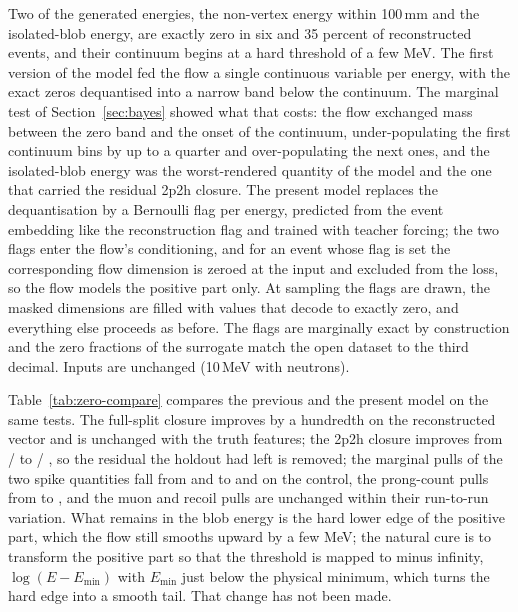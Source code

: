 \documentclass[11pt]{article}
\begin{document}
Two of the generated energies, the non-vertex energy within 100\,mm and the isolated-blob energy, are exactly
zero in six and 35 percent of reconstructed events, and their continuum begins at a hard threshold of a few MeV.
The first version of the model fed the flow a single continuous variable per energy, with the exact zeros
dequantised into a narrow band below the continuum. The marginal test of Section~\ref{sec:bayes} showed what that
costs: the flow exchanged mass between the zero band and the onset of the continuum, under-populating the first
continuum bins by up to a quarter and over-populating the next ones, and the isolated-blob energy was the
worst-rendered quantity of the model and the one that carried the residual 2p2h closure. The present model
replaces the dequantisation by a Bernoulli flag per energy, predicted from the event embedding like the
reconstruction flag and trained with teacher forcing; the two flags enter the flow's conditioning, and for an
event whose flag is set the corresponding flow dimension is zeroed at the input and excluded from the loss, so
the flow models the positive part only. At sampling the flags are drawn, the masked dimensions are filled with
values that decode to exactly zero, and everything else proceeds as before. The flags are marginally exact by
construction and the zero fractions of the surrogate match the open dataset to the third decimal. Inputs are
unchanged (10\,MeV with neutrons).

Table~\ref{tab:zero-compare} compares the previous and the present model on the same tests. The full-split
closure improves by a hundredth on the reconstructed vector and is unchanged with the truth features; the 2p2h
closure improves from \nZCAonheldoutTwoPTwoHOldM{} / \nZCAonheldoutTwoPTwoHOldC{} to \nZCAonheldoutTwoPTwoHNewM{} /
\nZCAonheldoutTwoPTwoHNewC{}, so the residual the holdout had left is removed; the marginal pulls of the two spike
quantities fall from \nZCPullNonvtxOldCtl{} and \nZCPullBlobsOldCtl{} to \nZCPullNonvtxNewCtl{} and
\nZCPullBlobsNewCtl{} on the control, the prong-count pulls from \nZCPullNprongOldCtl{} to
\nZCPullNprongNewCtl{}, and the muon and recoil pulls are unchanged within their run-to-run variation. What
remains in the blob energy is the hard lower edge of the positive part, which the flow still smooths upward by a
few MeV; the natural cure is to transform the positive part so that the threshold is mapped to minus infinity,
$\log(E - E_\mathrm{min})$ with $E_\mathrm{min}$ just below the physical minimum, which turns the hard edge into
a smooth tail. That change has not been made.
\end{document}
